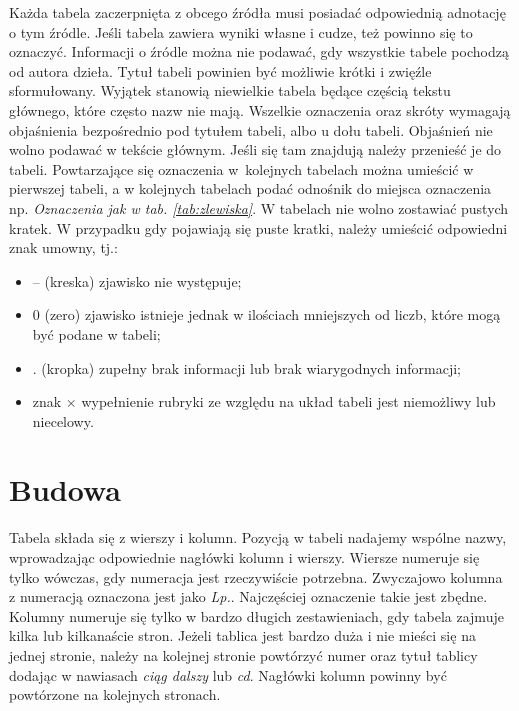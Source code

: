 Każda tabela zaczerpnięta z obcego źródła musi posiadać odpowiednią adnotację o tym źródle. Jeśli tabela zawiera wyniki własne i cudze, też powinno się to oznaczyć. Informacji o źródle można nie podawać, gdy wszystkie tabele pochodzą od autora dzieła. Tytuł tabeli powinien być możliwie krótki i zwięźle sformułowany. Wyjątek stanowią niewielkie tabela będące częścią tekstu głównego, które często nazw nie mają. Wszelkie oznaczenia oraz skróty wymagają objaśnienia bezpośrednio pod tytułem tabeli, albo u dołu tabeli. Objaśnień nie wolno podawać w tekście głównym. Jeśli się tam znajdują należy przenieść je do tabeli. Powtarzające się oznaczenia w~kolejnych tabelach można umieścić w pierwszej tabeli, a w kolejnych tabelach podać odnośnik do miejsca oznaczenia np. \textit{Oznaczenia jak w tab. \ref{tab:zlewiska}}. W tabelach nie wolno zostawiać pustych kratek. W przypadku gdy pojawiają się puste kratki, należy umieścić odpowiedni znak umowny, tj.:
\begin{itemize}
\item -- (kreska) \pauza zjawisko nie występuje;
\item 0 (zero) \pauza zjawisko istnieje jednak w ilościach mniejszych od liczb, które mogą być podane w tabeli;
\item . (kropka) \pauza zupełny brak informacji lub brak wiarygodnych informacji;
\item znak $\times$ \pauza wypełnienie rubryki ze względu na układ tabeli jest niemożliwy lub niecelowy.
\end{itemize}  
\section{Budowa}
Tabela składa się z wierszy i kolumn. Pozycją w tabeli nadajemy wspólne nazwy, wprowadzając odpowiednie nagłówki kolumn i wierszy. Wiersze numeruje się tylko wówczas, gdy numeracja jest rzeczywiście potrzebna. Zwyczajowo kolumna z numeracją oznaczona jest jako \textit{Lp.}. Najczęściej oznaczenie takie jest 
zbędne. Kolumny numeruje się tylko w bardzo długich zestawieniach, gdy tabela zajmuje kilka lub kilkanaście stron. Jeżeli tablica jest bardzo duża i nie mieści się na jednej stronie, należy na kolejnej stronie powtórzyć numer oraz tytuł tablicy dodając w nawiasach \textit{ciąg dalszy} lub \textit{cd}. Nagłówki kolumn powinny być powtórzone na kolejnych stronach.
